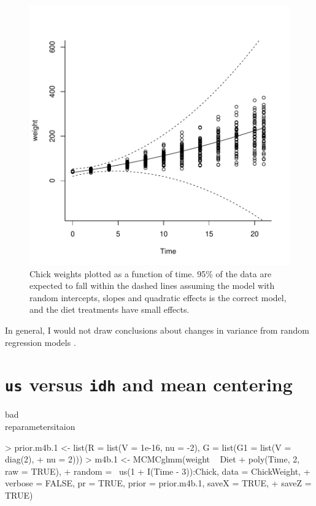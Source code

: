 \documentclass{article}
\begin{document}
\begin{figure}[!h]
\begin{center}
\includegraphics{Lecture4-040}
\end{center}
\caption{Chick weights plotted as a function of time. 95\% of the data are expected to fall within the dashed lines assuming the model with random intercepts, slopes and quadratic effects is the correct model, and the diet treatments have small effects.}
\label{VCVpred.3-fig}
\end{figure}

In general, I would not draw conclusions about changes in variance from random regression models \citep{Pletcher.1999a}.

\section{\texttt{us} versus \texttt{idh} and mean centering}
\label{RRcentering}
bad\\ 
reparametersitaion\\

\begin{Schunk}
\begin{Sinput}
> prior.m4b.1 <- list(R = list(V = 1e-16, nu = -2), G = list(G1 = list(V = diag(2), 
+     nu = 2)))
> m4b.1 <- MCMCglmm(weight ~ Diet + poly(Time, 2, raw = TRUE), 
+     random = ~us(1 + I(Time - 3)):Chick, data = ChickWeight, 
+     verbose = FALSE, pr = TRUE, prior = prior.m4b.1, saveX = TRUE, 
+     saveZ = TRUE)
\end{Sinput}
\end{Schunk}
\end{document}

